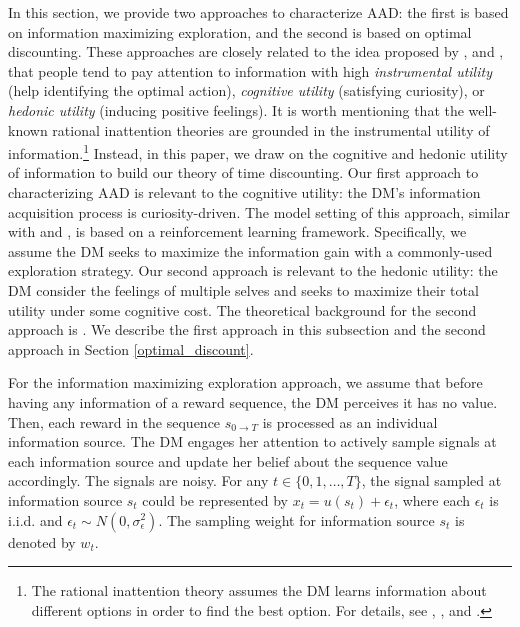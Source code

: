 \documentclass[
  12pt,
]{article}
\begin{document}
In this section, we provide two approaches to characterize AAD: the
first is based on information maximizing exploration, and the second is
based on optimal discounting. These approaches are closely related to
the idea proposed by \citet{gottlieb2012attention},
\citet{gottlieb2013information} and \citet{sharot2020people}, that
people tend to pay attention to information with high \emph{instrumental
utility} (help identifying the optimal action), \emph{cognitive utility}
(satisfying curiosity), or \emph{hedonic utility} (inducing positive
feelings). It is worth mentioning that the well-known rational
inattention theories are grounded in the instrumental utility of
information.\footnote{The rational inattention theory assumes the DM
  learns information about different options in order to find the best
  option. For details, see \citet{sims2003implications},
  \citet{matvejka2015rational}, and \citet{mackowiak2023rational}.}
Instead, in this paper, we draw on the cognitive and hedonic utility of
information to build our theory of time discounting. Our first approach
to characterizing AAD is relevant to the cognitive utility: the DM's
information acquisition process is curiosity-driven. The model setting
of this approach, similar with \citet{gottlieb2012attention} and
\citet{gottlieb2013information}, is based on a reinforcement learning
framework. Specifically, we assume the DM seeks to maximize the
information gain with a commonly-used exploration strategy. Our second
approach is relevant to the hedonic utility: the DM consider the
feelings of multiple selves and seeks to maximize their total utility
under some cognitive cost. The theoretical background for the second
approach is \citet{noor2022optimal,noor2024constrained}. We describe the
first approach in this subsection and the second approach in Section
\ref{optimal_discount}.

For the information maximizing exploration approach, we assume that
before having any information of a reward sequence, the DM perceives it
has no value. Then, each reward in the sequence \(s_{0\rightarrow T}\)
is processed as an individual information source. The DM engages her
attention to actively sample signals at each information source and
update her belief about the sequence value accordingly. The signals are
noisy. For any \(t\in\{0,1,…,T\}\), the signal sampled at information
source \(s_t\) could be represented by \(x_t =u(s_t)+\epsilon_t\), where
each \(\epsilon_t\) is i.i.d. and
\(\epsilon_t \sim N(0,\sigma_\epsilon^2)\). The sampling weight for
information source \(s_t\) is denoted by \(w_t\).
\end{document}
